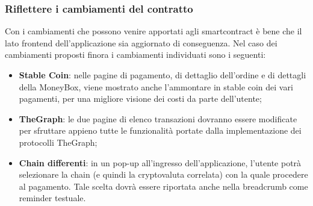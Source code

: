 \subsubsection{Riflettere i cambiamenti del contratto}

Con i cambiamenti che possono venire apportati agli smartcontract è bene che il lato frontend dell'applicazione sia aggiornato di conseguenza.
Nel caso dei cambiamenti proposti finora i cambiamenti individuati sono i seguenti:
\begin{itemize}
    \item \textbf{Stable Coin}: nelle pagine di pagamento, di dettaglio dell'ordine e di dettagli della MoneyBox, viene mostrato anche l'ammontare in stable coin dei vari pagamenti, per una migliore visione dei costi da parte dell'utente;
    \item \textbf{TheGraph}: le due pagine di elenco transazioni dovranno essere modificate per sfruttare appieno tutte le funzionalità portate dalla implementazione dei protocolli TheGraph;
    \item \textbf{Chain differenti}:  in un pop-up all'ingresso dell'applicazione, l'utente potrà selezionare la chain (e quindi la cryptovaluta correlata) con la quale procedere al pagamento. Tale scelta dovrà essere riportata anche nella breadcrumb come reminder testuale.
\end{itemize}

